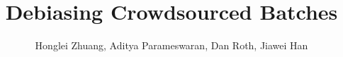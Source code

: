 \documentclass{sig-alternate}
\newcommand{\hide}[1]{} %
\begin{document}
\title{
Debiasing Crowdsourced Batches %
}



\author{
\alignauthor Honglei Zhuang, Aditya Parameswaran, Dan Roth, Jiawei Han \\
  \\
  \\
}



%



\maketitle




\hide{
\category{H.2.8}{Database Applications}{Data mining}
\category{J.4}{Social and Behavioral Sciences}{Psychology}

\keywords{Crowdsourcing; annotation bias; worker model}
}


\sloppy











\vspace{-0.1in}
\small




%
\end{document}
